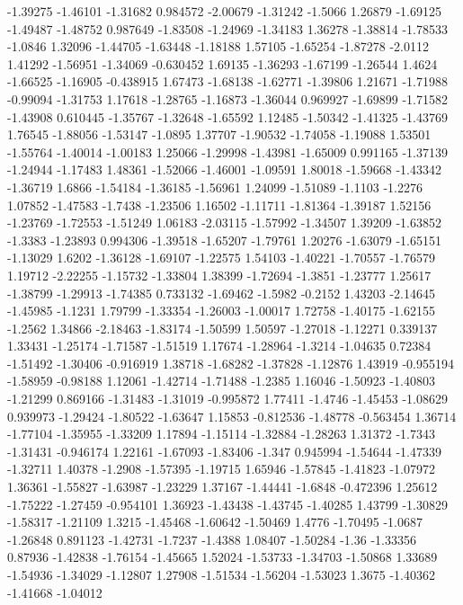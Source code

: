 \documentclass[9pt]{article}
\theoremstyle{plain}
\theoremstyle{definition}
\theoremstyle{remark}
\numberwithin{equation}{section}
\begin{document}
-1.39275
-1.46101
-1.31682
0.984572
-2.00679
-1.31242
-1.5066
1.26879
-1.69125
-1.49487
-1.48752
0.987649
-1.83508
-1.24969
-1.34183
1.36278
-1.38814
-1.78533
-1.0846
1.32096
-1.44705
-1.63448
-1.18188
1.57105
-1.65254
-1.87278
-2.0112
1.41292
-1.56951
-1.34069
-0.630452
1.69135
-1.36293
-1.67199
-1.26544
1.4624
-1.66525
-1.16905
-0.438915
1.67473
-1.68138
-1.62771
-1.39806
1.21671
-1.71988
-0.99094
-1.31753
1.17618
-1.28765
-1.16873
-1.36044
0.969927
-1.69899
-1.71582
-1.43908
0.610445
-1.35767
-1.32648
-1.65592
1.12485
-1.50342
-1.41325
-1.43769
1.76545
-1.88056
-1.53147
-1.0895
1.37707
-1.90532
-1.74058
-1.19088
1.53501
-1.55764
-1.40014
-1.00183
1.25066
-1.29998
-1.43981
-1.65009
0.991165
-1.37139
-1.24944
-1.17483
1.48361
-1.52066
-1.46001
-1.09591
1.80018
-1.59668
-1.43342
-1.36719
1.6866
-1.54184
-1.36185
-1.56961
1.24099
-1.51089
-1.1103
-1.2276
1.07852
-1.47583
-1.7438
-1.23506
1.16502
-1.11711
-1.81364
-1.39187
1.52156
-1.23769
-1.72553
-1.51249
1.06183
-2.03115
-1.57992
-1.34507
1.39209
-1.63852
-1.3383
-1.23893
0.994306
-1.39518
-1.65207
-1.79761
1.20276
-1.63079
-1.65151
-1.13029
1.6202
-1.36128
-1.69107
-1.22575
1.54103
-1.40221
-1.70557
-1.76579
1.19712
-2.22255
-1.15732
-1.33804
1.38399
-1.72694
-1.3851
-1.23777
1.25617
-1.38799
-1.29913
-1.74385
0.733132
-1.69462
-1.5982
-0.2152
1.43203
-2.14645
-1.45985
-1.1231
1.79799
-1.33354
-1.26003
-1.00017
1.72758
-1.40175
-1.62155
-1.2562
1.34866
-2.18463
-1.83174
-1.50599
1.50597
-1.27018
-1.12271
0.339137
1.33431
-1.25174
-1.71587
-1.51519
1.17674
-1.28964
-1.3214
-1.04635
0.72384
-1.51492
-1.30406
-0.916919
1.38718
-1.68282
-1.37828
-1.12876
1.43919
-0.955194
-1.58959
-0.98188
1.12061
-1.42714
-1.71488
-1.2385
1.16046
-1.50923
-1.40803
-1.21299
0.869166
-1.31483
-1.31019
-0.995872
1.77411
-1.4746
-1.45453
-1.08629
0.939973
-1.29424
-1.80522
-1.63647
1.15853
-0.812536
-1.48778
-0.563454
1.36714
-1.77104
-1.35955
-1.33209
1.17894
-1.15114
-1.32884
-1.28263
1.31372
-1.7343
-1.31431
-0.946174
1.22161
-1.67093
-1.83406
-1.347
0.945994
-1.54644
-1.47339
-1.32711
1.40378
-1.2908
-1.57395
-1.19715
1.65946
-1.57845
-1.41823
-1.07972
1.36361
-1.55827
-1.63987
-1.23229
1.37167
-1.44441
-1.6848
-0.472396
1.25612
-1.75222
-1.27459
-0.954101
1.36923
-1.43438
-1.43745
-1.40285
1.43799
-1.30829
-1.58317
-1.21109
1.3215
-1.45468
-1.60642
-1.50469
1.4776
-1.70495
-1.0687
-1.26848
0.891123
-1.42731
-1.7237
-1.4388
1.08407
-1.50284
-1.36
-1.33356
0.87936
-1.42838
-1.76154
-1.45665
1.52024
-1.53733
-1.34703
-1.50868
1.33689
-1.54936
-1.34029
-1.12807
1.27908
-1.51534
-1.56204
-1.53023
1.3675
-1.40362
-1.41668
-1.04012
\end{document}
